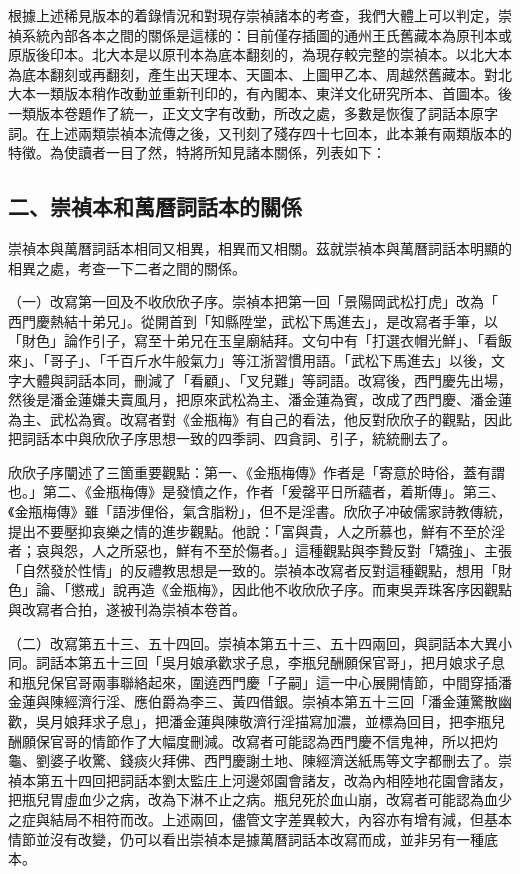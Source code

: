 根據上述稀見版本的着錄情況和對現存崇禎諸本的考查，我們大體上可以判定，崇禎系統內部各本之間的關係是這樣的：目前僅存插圖的通州王氏舊藏本為原刊本或原版後印本。北大本是以原刊本為底本翻刻的，為現存較完整的崇禎本。以北大本為底本翻刻或再翻刻，產生出天理本、天圖本、上圖甲乙本、周越然舊藏本。對北大本一類版本稍作改動並重新刊印的，有內閣本、東洋文化研究所本、首圖本。後一類版本卷題作了統一，正文文字有改動，所改之處，多數是恢復了詞話本原字詞。在上述兩類崇禎本流傳之後，又刊刻了殘存四十七回本，此本兼有兩類版本的特徵。為使讀者一目了然，特將所知見諸本關係，列表如下：
{\clearpage}


\subsection*{二、崇禎本和萬曆詞話本的關係}

崇禎本與萬曆詞話本相同又相異，相異而又相關。茲就崇禎本與萬曆詞話本明顯的相異之處，考查一下二者之間的關係。

（一）改寫第一回及不收欣欣子序。崇禎本把第一回「景陽岡武松打虎」改為「 西門慶熱結十弟兄」。從開首到「知縣陞堂，武松下馬進去」，是改寫者手筆，以 「財色」論作引子，寫至十弟兄在玉皇廟結拜。文句中有「打選衣帽光鮮」、「看飯來」、「哥子」、「千百斤水牛般氣力」等江浙習慣用語。「武松下馬進去」以後，文字大體與詞話本同，刪減了「看顧」、「叉兒難」等詞語。改寫後，西門慶先出場，然後是潘金蓮嫌夫賣風月，把原來武松為主、潘金蓮為賓，改成了西門慶、潘金蓮為主、武松為賓。改寫者對《金瓶梅》有自己的看法，他反對欣欣子的觀點，因此把詞話本中與欣欣子序思想一致的四季詞、四貪詞、引子，統統刪去了。

欣欣子序闡述了三箇重要觀點：第一、《金瓶梅傳》作者是「寄意於時俗，蓋有謂也。」第二、《金瓶梅傳》是發憤之作，作者「爰罄平日所蘊者，着斯傳」。第三、《金瓶梅傳》雖「語涉俚俗，氣含脂粉」，但不是淫書。欣欣子冲破儒家詩教傳統，提出不要壓抑哀樂之情的進步觀點。他說：「富與貴，人之所慕也，鮮有不至於淫者；哀與怨，人之所惡也，鮮有不至於傷者。」這種觀點與李贄反對「矯強」、主張「自然發於性情」的反禮教思想是一致的。崇禎本改寫者反對這種觀點，想用「財色」論、「懲戒」說再造《金瓶梅》，因此他不收欣欣子序。而東吳弄珠客序因觀點與改寫者合拍，遂被刊為崇禎本卷首。

（二）改寫第五十三、五十四回。崇禎本第五十三、五十四兩回，與詞話本大異小同。詞話本第五十三回「吳月娘承歡求子息，李瓶兒酬願保官哥」，把月娘求子息和瓶兒保官哥兩事聯絡起來，圍遶西門慶「子嗣」這一中心展開情節，中間穿插潘金蓮與陳經濟行淫、應伯爵為李三、黃四借銀。崇禎本第五十三回「潘金蓮驚散幽歡，吳月娘拜求子息」，把潘金蓮與陳敬濟行淫描寫加濃，並標為回目，把李瓶兒酬願保官哥的情節作了大幅度刪減。改寫者可能認為西門慶不信鬼神，所以把灼龜、劉婆子收驚、錢痰火拜佛、西門慶謝土地、陳經濟送紙馬等文字都刪去了。崇禎本第五十四回把詞話本劉太監庄上河邊郊園會諸友，改為內相陸地花園會諸友，把瓶兒胃虛血少之病，改為下淋不止之病。瓶兒死於血山崩，改寫者可能認為血少之症與結局不相符而改。上述兩回，儘管文字差異較大，內容亦有增有減，但基本情節並沒有改變，仍可以看出崇禎本是據萬曆詞話本改寫而成，並非另有一種底本。

